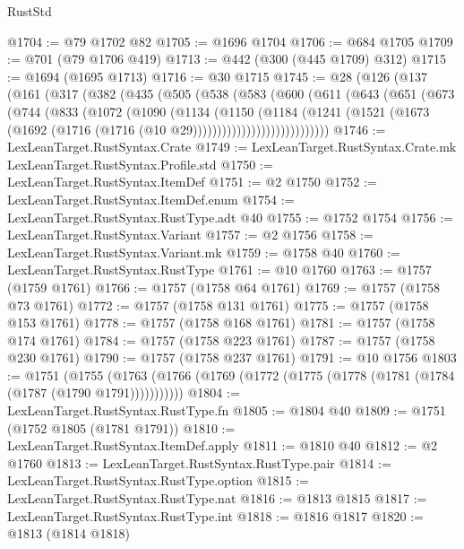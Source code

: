 \begin{lexlean}{RustStd}
\begin{coremodule}
@1704 := @79 @1702 @82
@1705 := @1696 @1704
@1706 := @684 @1705
@1709 := @701 (@79 @1706 @419)
@1713 := @442 (@300 (@445 @1709) @312)
@1715 := @1694 (@1695 @1713)
@1716 := @30 @1715
@1745 := @28
    (@126
      (@137
        (@161
          (@317
            (@382
              (@435
                (@505
                  (@538
                    (@583
                      (@600
                        (@611
                          (@643
                            (@651
                              (@673
                                (@744
                                  (@833
                                    (@1072
                                      (@1090
                                        (@1134
                                          (@1150
                                            (@1184
                                              (@1241
                                                (@1521
                                                  (@1673
                                                    (@1692
                                                      (@1716
                                                        (@1716 (@10 @29))))))))))))))))))))))))))))
@1746 := LexLeanTarget.RustSyntax.Crate
@1749 := LexLeanTarget.RustSyntax.Crate.mk LexLeanTarget.RustSyntax.Profile.std
@1750 := LexLeanTarget.RustSyntax.ItemDef
@1751 := @2 @1750
@1752 := LexLeanTarget.RustSyntax.ItemDef.enum
@1754 := LexLeanTarget.RustSyntax.RustType.adt @40
@1755 := @1752 @1754
@1756 := LexLeanTarget.RustSyntax.Variant
@1757 := @2 @1756
@1758 := LexLeanTarget.RustSyntax.Variant.mk
@1759 := @1758 @40
@1760 := LexLeanTarget.RustSyntax.RustType
@1761 := @10 @1760
@1763 := @1757 (@1759 @1761)
@1766 := @1757 (@1758 @64 @1761)
@1769 := @1757 (@1758 @73 @1761)
@1772 := @1757 (@1758 @131 @1761)
@1775 := @1757 (@1758 @153 @1761)
@1778 := @1757 (@1758 @168 @1761)
@1781 := @1757 (@1758 @174 @1761)
@1784 := @1757 (@1758 @223 @1761)
@1787 := @1757 (@1758 @230 @1761)
@1790 := @1757 (@1758 @237 @1761)
@1791 := @10 @1756
@1803 := @1751
    (@1755 (@1763 (@1766 (@1769 (@1772 (@1775 (@1778 (@1781 (@1784 (@1787 (@1790 @1791)))))))))))
@1804 := LexLeanTarget.RustSyntax.RustType.fn
@1805 := @1804 @40
@1809 := @1751 (@1752 @1805 (@1781 @1791))
@1810 := LexLeanTarget.RustSyntax.ItemDef.apply
@1811 := @1810 @40
@1812 := @2 @1760
@1813 := LexLeanTarget.RustSyntax.RustType.pair
@1814 := LexLeanTarget.RustSyntax.RustType.option
@1815 := LexLeanTarget.RustSyntax.RustType.nat
@1816 := @1813 @1815
@1817 := LexLeanTarget.RustSyntax.RustType.int
@1818 := @1816 @1817
@1820 := @1813 (@1814 @1818)

\end{coremodule}
\end{lexlean}
